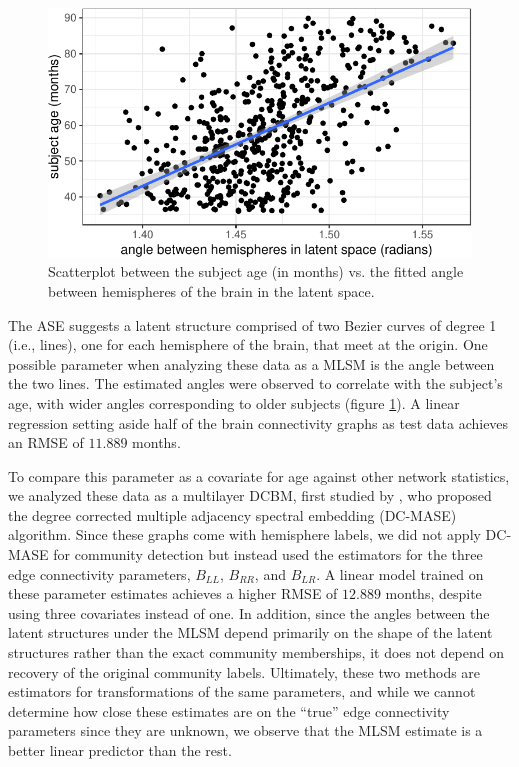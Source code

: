\documentclass[12pt]{article}
\begin{document}
\begin{figure}[H]

{\centering \includegraphics{draft_files/figure-latex/hcp-age-regression-1} 

}

\caption{Scatterplot between the subject age (in months) vs. the fitted angle between hemispheres of the brain in the latent space.}\label{fig:hcp-age-regression}
\end{figure}

The ASE suggests a latent structure comprised of two Bezier curves of
degree 1 (i.e., lines), one for each hemisphere of the brain, that meet
at the origin. One possible parameter when analyzing these data as a
MLSM is the angle between the two lines. The estimated angles were
observed to correlate with the subject's age, with wider angles
corresponding to older subjects (figure \ref{fig:hcp-age-regression}). A
linear regression setting aside half of the brain connectivity graphs as
test data achieves an RMSE of \(11.889\) months.

To compare this parameter as a covariate for age against other network
statistics, we analyzed these data as a multilayer DCBM, first studied
by \citep{agterberg2022joint}, who proposed the degree corrected
multiple adjacency spectral embedding (DC-MASE) algorithm. Since these
graphs come with hemisphere labels, we did not apply DC-MASE for
community detection but instead used the estimators for the three edge
connectivity parameters, \(B_{LL}\), \(B_{RR}\), and \(B_{LR}\). A
linear model trained on these parameter estimates achieves a higher RMSE
of \(12.889\) months, despite using three covariates instead of one. In
addition, since the angles between the latent structures under the MLSM
depend primarily on the shape of the latent structures rather than the
exact community memberships, it does not depend on recovery of the
original community labels. Ultimately, these two methods are estimators
for transformations of the same parameters, and while we cannot
determine how close these estimates are on the ``true'' edge
connectivity parameters since they are unknown, we observe that the MLSM
estimate is a better linear predictor than the rest.
\end{document}
